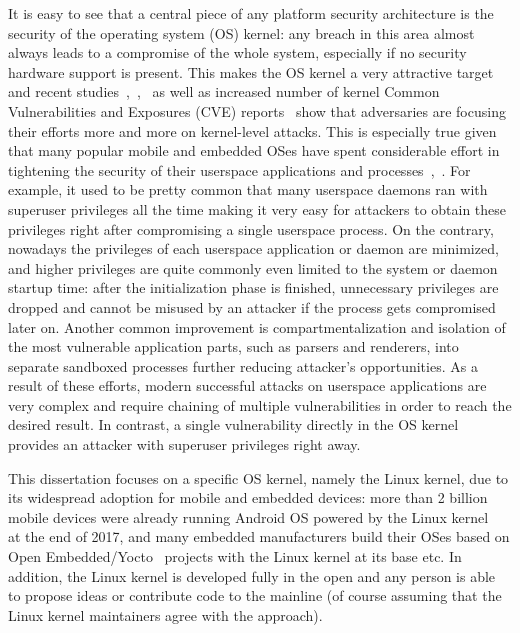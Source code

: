 
It is easy to see that a central piece of any platform security architecture is the security of the operating system (OS) kernel: any breach in this area almost always leads to a compromise of the whole system, especially if no security hardware support is present. This makes the OS kernel a very attractive target and recent studies~\cite{stoep2016android},~\cite{tolvanen2017},~\cite{windowsexploits} as well as increased number of kernel Common Vulnerabilities and Exposures (CVE) reports~\cite{nistCves} show that adversaries are focusing their efforts more and more on kernel-level attacks. This is especially true given that many popular mobile and embedded OSes have spent considerable effort in tightening the security of their userspace applications and processes~\cite{stoep2016android},~\cite{tolvanen2017}. For example, it used to be pretty common that many userspace daemons ran with superuser privileges all the time making it very easy for attackers to obtain these privileges right after compromising a single userspace process. On the contrary, nowadays the privileges of each userspace application or daemon are minimized, and higher privileges are quite commonly even limited to the system or daemon startup time: after the initialization phase is finished, unnecessary privileges are dropped and cannot be misused by an attacker if the process gets compromised later on. Another common improvement is compartmentalization and isolation of the most vulnerable application parts, such as parsers and renderers, into separate sandboxed processes further reducing attacker's opportunities. As a result of these efforts, modern successful attacks on userspace applications are very complex and require chaining of multiple vulnerabilities in order to reach the desired result. In contrast, a single vulnerability directly in the OS kernel provides an attacker with superuser privileges right away.

This dissertation focuses on a specific OS kernel, namely the Linux kernel, due to its widespread adoption for mobile and embedded devices: more than 2 billion mobile devices were already running Android OS powered by the Linux kernel~\cite{googleio2017} at the end of 2017, and many embedded manufacturers build their OSes based on Open Embedded/Yocto~\cite{OE2017, yocto2017} projects with the Linux kernel at its base etc. 
In addition, the Linux kernel is developed fully in the open and any person is able to propose ideas or contribute code to the mainline (of course assuming that the Linux kernel maintainers agree with the approach).

